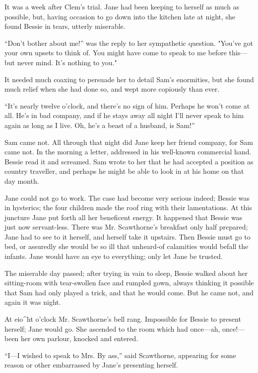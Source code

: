 It was a week after Clem's trial. Jane had been keeping to herself as
much as possible, but, having occasion to go down into the kitchen late
at night, she found Bessie in tears, utterly miserable.

``Don't bother about me!'' was the reply to her sympathetic question.
"You've got {} your own upsets to think of. You might have come to speak
to me before this---but never mind. It's nothing to you."

It needed much coaxing to persuade her to detail Sam's enormities, but
she found much relief when she had done so, and wept more copiously than
ever.

``It's nearly twelve o'clock, and there's no sign of him. Perhaps he
won't come at all. He's in bad company, and if he stays away all night
I'll never speak to him again as long as I live. Oh, he's a beast of a
husband, is Sam!''

Sam came not. All through that night did Jane keep her friend company,
for Sam came not. In the morning a letter, addressed in his well-known
commercial hand. Bessie read it and screamed. Sam wrote to her that he
had accepted a position as country traveller, and perhaps he might be
able to look in at his home on that day month.

Jane could not go to work. The case had become very serious indeed;
Bessie was in hysterics; the four children made the roof ring with their
lamentations. At this juncture Jane put forth all her beneficent energy.
{} It happened that Bessie was just now servant-less. There was Mr.
Scawthorne's breakfast only half prepared; Jane had to see to it
herself, and herself take it upstairs. Then Bessie must go to bed, or
assuredly she would be so ill that unheard-of calamities would befall
the infants. Jane would have an eye to everything; only let Jane be
trusted.

The miserable day passed; after trying in vain to sleep, Bessie walked
about her sitting-room with tear-swollen face and rumpled gown, always
thinking it possible that Sam had only played a trick, and that he would
come. But he came not, and again it was night.

At eio\^{}ht o'clock Mr. Scawthorne's bell rang. Impossible for Bessie
to present herself; Jane would go. She ascended to the room which had
once---ah, once!---been her own parlour, knocked and entered.

``I---I wished to speak to Mrs. By ass,'' said Scawthorne, appearing for
some reason or other embarrassed by Jane's presenting herself.

